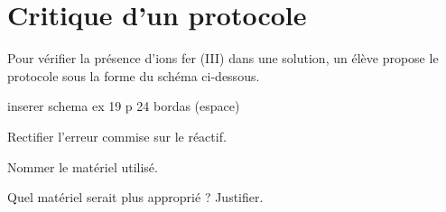 \section{Critique d'un protocole}

Pour vérifier la présence d'ions fer (III)  dans une solution, un élève propose le protocole sous la forme du schéma ci-dessous.


inserer schema  ex 19 p 24 bordas (espace)
\begin{questions}
	\question Rectifier l'erreur commise sur le réactif.
	
	\question Nommer le matériel utilisé.
	
	\question Quel matériel serait plus approprié ? Justifier.
\end{questions}